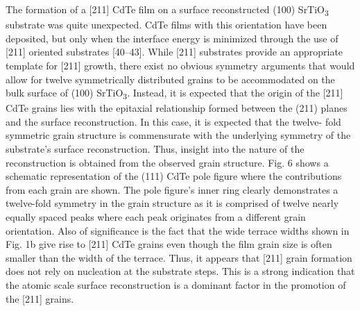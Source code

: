 The formation of a [211] CdTe film on a surface reconstructed
(100) SrTiO\textsubscript{3} substrate was quite unexpected. CdTe films with this
orientation have been deposited, but only when the interface
energy is minimized through the use of [211] oriented substrates
[40–43]. While [211] substrates provide an appropriate template
for [211] growth, there exist no obvious symmetry arguments
that would allow for twelve symmetrically distributed grains to be
accommodated on the bulk surface of (100) SrTiO\textsubscript{3}. Instead, it is
expected that the origin of the [211] CdTe grains lies with the
epitaxial relationship formed between the (211) planes and the
surface reconstruction. In this case, it is expected that the twelve-
fold symmetric grain structure is commensurate with the underlying symmetry of the substrate’s surface reconstruction. Thus,
insight into the nature of the reconstruction is obtained from the
observed grain structure. Fig. 6 shows a schematic representation
of the (111) CdTe pole figure where the contributions from each
grain are shown. The pole figure’s inner ring clearly demonstrates a
twelve-fold symmetry in the grain structure as it is comprised of twelve nearly equally spaced peaks where each peak originates
from a different grain orientation. Also of significance is the fact
that the wide terrace widths shown in Fig. 1b give rise to [211]
CdTe grains even though the film grain size is often smaller than
the width of the terrace. Thus, it appears that [211] grain
formation does not rely on nucleation at the substrate steps. This is
a strong indication that the atomic scale surface reconstruction is a
dominant factor in the promotion of the [211] grains.

